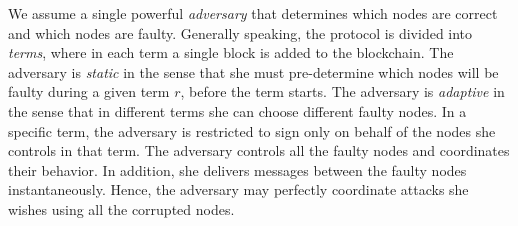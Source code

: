 We assume a single powerful \emph{adversary} that determines which nodes are correct and which nodes are faulty. Generally speaking, the protocol is divided into \emph{terms}, where in each term a single block is added to the blockchain. The adversary is \emph{static} in the sense that she must pre-determine which nodes will be faulty during a given term $r$, before the term starts. The adversary is \emph{adaptive} in the sense that in different terms she can choose different faulty nodes. In a specific term, the adversary is restricted to sign only on behalf of the nodes she controls in that term.
The adversary controls all the faulty nodes and coordinates their behavior. In addition, she delivers messages between the faulty nodes instantaneously. Hence, the adversary may perfectly coordinate attacks she wishes using all the corrupted nodes. 

